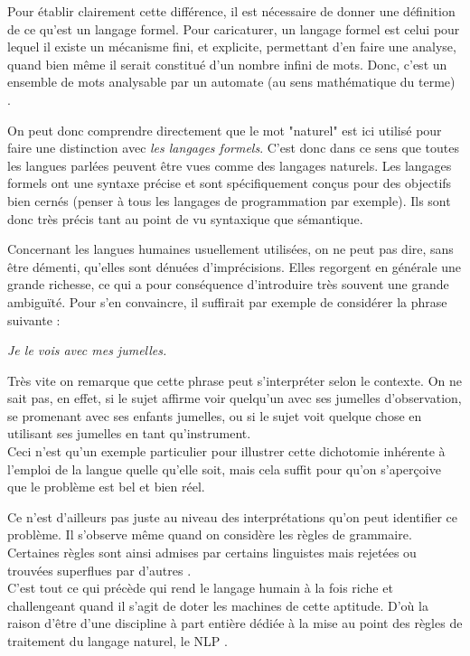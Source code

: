 Pour établir clairement cette différence, il est nécessaire de donner une définition de ce qu'est un langage formel. Pour caricaturer, un langage formel est celui pour lequel il  existe un mécanisme fini, et explicite, permettant d'en faire une analyse, quand bien même il serait constitué d'un nombre infini de mots. Donc, c'est un ensemble de mots analysable par un automate (au sens mathématique du terme) \cite{carton2014langages}.

On peut donc comprendre directement que le mot "naturel" est ici utilisé pour faire une distinction avec \textit{les langages formels}. C'est donc dans ce sens que toutes les langues parlées peuvent être vues comme des langages naturels. Les langages formels ont une syntaxe précise et sont spécifiquement conçus pour des objectifs bien cernés (penser à tous les langages de programmation par exemple). Ils sont donc très précis tant au point de vu syntaxique que sémantique.

Concernant les langues humaines usuellement utilisées, on ne peut pas dire, sans être démenti, qu'elles sont dénuées d'imprécisions. Elles regorgent en générale une grande richesse, ce qui a pour conséquence d'introduire très souvent une grande ambiguïté. Pour s'en convaincre, il suffirait par exemple de considérer la phrase suivante :
\begin{center}
\textit{Je le vois avec mes jumelles.}
\end{center}
Très vite on remarque que cette phrase peut s'interpréter selon le contexte. On ne sait pas, en effet, si le sujet affirme voir quelqu'un avec ses jumelles d'observation, se promenant avec ses enfants jumelles, ou si le sujet voit quelque chose en utilisant ses jumelles en tant qu'instrument.\\
Ceci n'est qu'un exemple particulier pour illustrer cette dichotomie inhérente à l'emploi de la langue quelle qu'elle soit, mais cela suffit pour qu'on s'aperçoive que le problème est bel et bien réel.

Ce n'est d'ailleurs pas juste au niveau des interprétations qu'on peut identifier ce problème. Il s'observe même quand on considère les règles de grammaire. Certaines règles sont ainsi admises par certains linguistes mais rejetées ou trouvées superflues par d'autres \cite{jurafsky2014speech}.\\
C'est tout ce qui précède qui rend le langage humain à la fois riche et challengeant quand il s'agit de doter les machines de cette aptitude. D'où la raison d'être d'une discipline à part entière dédiée à la mise au point des règles de traitement du langage naturel, le NLP \cite{hagiwara2021real}.

